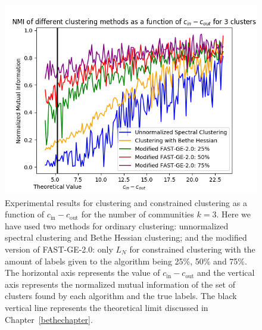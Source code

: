 \begin{figure}[h]
\begin{center}
\includegraphics[width=13cm]{figures/ACDV2.png}
\end{center}
   \caption[Experimental results for clustering and constrained clustering as a function of $c_\text{in} - c_\text{out}$ for the number of communities $k=3$]{Experimental results for clustering and constrained clustering as a function of $c_\text{in} - c_\text{out}$ for the number of communities $k=3$. Here we have used two methods for ordinary clustering: unnormalized spectral clustering and Bethe Hessian clustering; and the modified version of FAST-GE-2.0: only $L_N$ for constrained clustering with the amount of labels given to the algorithm being 25\%, 50\% and 75\%. The horizontal axis represents the value of $c_\text{in} - c_\text{out}$ and the vertical axis represents the normalized mutual information of the set of clusters found by each algorithm and the true labels. The black vertical line represents the theoretical limit discussed in Chapter~\ref{bethechapter}.}
\label{ACDV2}
\end{figure}

